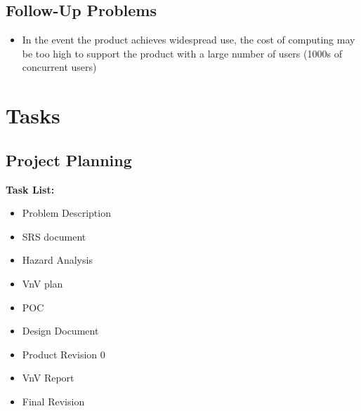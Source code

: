 \documentclass[12pt]{article}
\begin{document}
\subsection{Follow-Up Problems}
\begin{itemize}
    \item In the event the product achieves widespread use, the cost of computing may be too high to support the product with a large number of users (1000s of concurrent users)
\end{itemize}

\section{Tasks}
\subsection{Project Planning}
\textbf{Task List:}
\begin{itemize}
    \item Problem Description
    \item SRS document
    \item Hazard Analysis
    \item VnV plan
    \item POC
    \item Design Document
    \item Product Revision 0
    \item VnV Report
    \item Final Revision
\end{itemize}
\end{document}
